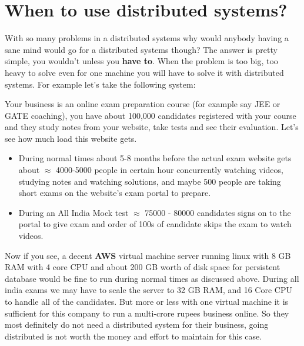 \section{When to use distributed systems?}
With so many problems in a distributed systems why would anybody having a sane mind would go for a distributed systems though? The answer is pretty simple, you wouldn't unless you \textbf{have to}. When the problem is too big, too heavy to solve even for one machine you will have to solve it with distributed systems. For example let's take the following system:

\noindent Your business is an online exam preparation course (for example say JEE or GATE coaching), you have about 100,000 candidates registered with your course and they study notes from your website, take tests and see their evaluation. Let's see how much load this website gets.
\begin{itemize}
    \item During normal times about 5-8 months before the actual exam website gets about $\approx$ 4000-5000 people in certain hour concurrently watching videos, studying notes and watching solutions, and maybe 500 people are taking short exams on the website's exam portal to prepare.
    \item During an All India Mock test $\approx$ 75000 - 80000 candidates signs on to the portal to give exam and order of 100s of candidate skips the exam to watch videos.
\end{itemize}

\noindent Now if you see, a decent \textbf{AWS} virtual machine server running linux with 8 GB RAM with 4 core CPU and about 200 GB worth of disk space for persistent database would be fine to run during normal times as discussed above. During all india exams we may have to scale the server to 32 GB RAM, and 16 Core CPU to handle all of the candidates. But more or less with one virtual machine it is sufficient for this company to run a multi-crore rupees business online. So they most definitely do not need a distributed system for their business, going distributed is not worth the money and effort to maintain for this case.

